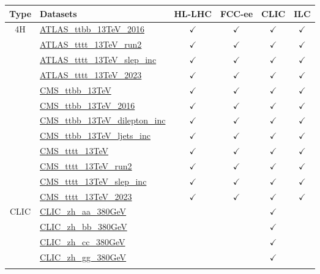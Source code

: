 \documentclass{article}
\begin{document}
\begin{longtable}{|c|l|c|c|c|c|}
\hline
\footnotesize
 Type & Datasets  & HL-LHC & FCC-ee & CLIC & ILC \\ \hline
\multirow{12}{*}{4H}
 & \href{https://arxiv.org}{ATLAS_ttbb_13TeV_2016}  & $\checkmark$ & $\checkmark$ & $\checkmark$ & $\checkmark$\\ \cline{2-6}
 & \href{https://arxiv.org}{ATLAS_tttt_13TeV_run2}  & $\checkmark$ & $\checkmark$ & $\checkmark$ & $\checkmark$\\ \cline{2-6}
 & \href{https://arxiv.org}{ATLAS_tttt_13TeV_slep_inc}  & $\checkmark$ & $\checkmark$ & $\checkmark$ & $\checkmark$\\ \cline{2-6}
 & \href{https://arxiv.org}{ATLAS_tttt_13TeV_2023}  & $\checkmark$ & $\checkmark$ & $\checkmark$ & $\checkmark$\\ \cline{2-6}
 & \href{https://arxiv.org}{CMS_ttbb_13TeV}  & $\checkmark$ & $\checkmark$ & $\checkmark$ & $\checkmark$\\ \cline{2-6}
 & \href{https://arxiv.org}{CMS_ttbb_13TeV_2016}  & $\checkmark$ & $\checkmark$ & $\checkmark$ & $\checkmark$\\ \cline{2-6}
 & \href{https://arxiv.org}{CMS_ttbb_13TeV_dilepton_inc}  & $\checkmark$ & $\checkmark$ & $\checkmark$ & $\checkmark$\\ \cline{2-6}
 & \href{https://arxiv.org}{CMS_ttbb_13TeV_ljets_inc}  & $\checkmark$ & $\checkmark$ & $\checkmark$ & $\checkmark$\\ \cline{2-6}
 & \href{https://arxiv.org}{CMS_tttt_13TeV}  & $\checkmark$ & $\checkmark$ & $\checkmark$ & $\checkmark$\\ \cline{2-6}
 & \href{https://arxiv.org}{CMS_tttt_13TeV_run2}  & $\checkmark$ & $\checkmark$ & $\checkmark$ & $\checkmark$\\ \cline{2-6}
 & \href{https://arxiv.org}{CMS_tttt_13TeV_slep_inc}  & $\checkmark$ & $\checkmark$ & $\checkmark$ & $\checkmark$\\ \cline{2-6}
 & \href{https://arxiv.org}{CMS_tttt_13TeV_2023}  & $\checkmark$ & $\checkmark$ & $\checkmark$ & $\checkmark$
\\ \hline
\multirow{68}{*}{CLIC}
 & \href{https://arxiv.org}{CLIC_zh_aa_380GeV}  &  &  & $\checkmark$ & \\ \cline{2-6}
 & \href{https://arxiv.org}{CLIC_zh_bb_380GeV}  &  &  & $\checkmark$ & \\ \cline{2-6}
 & \href{https://arxiv.org}{CLIC_zh_cc_380GeV}  &  &  & $\checkmark$ & \\ \cline{2-6}
 & \href{https://arxiv.org}{CLIC_zh_gg_380GeV}  &  &  & $\checkmark$ & \\ \cline{2-6}

\end{longtable}
\end{document}
